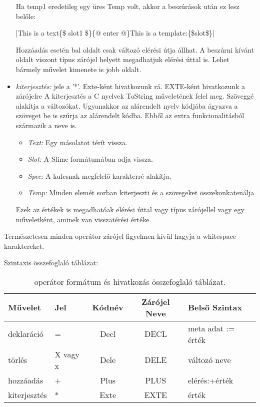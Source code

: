 \begin{itemize}
Ha temp1 eredetileg egy üres Temp volt, akkor a beszúrások után ez lesz belőle:

{|This is a text\{\$ slot1 \$\}\{@ enter @\}This is a template:\{\$slot\$\}|}

Hozzáadás esetén bal oldalt csak változó elérési útja állhat.
A beszúrni kívánt oldalt viszont típus zárójel helyett megadhatjuk elérési úttal is.
Lehet bármely művelet kimenete is jobb oldalt.
\item \emph{kiterjesztés:}
jele a '*'.
Exte-ként hivatkozunk rá.
EXTE-ként hivatkozunk a zárójelre
A kiterjesztés a C nyelvek ToString műveletének felel meg. 
Szöveggé alakítja a változókat.
Ugyanakkor az alárendelt nyelv kódjába ágyazva a szöveget be is szúrja az alárendelt kódba. 
Ebből az extra funkcionalitásból származik a neve is.
\begin{itemize}
\item\emph{Text:} Egy másolatot térít vissza.
\item\emph{Slot:} A Slime formátumában adja vissza.
\item\emph{Spec:} A kulcsnak megfelelő karakterré alakítja.
\item\emph{Temp:} Minden elemét sorban kiterjeszti és a szövegeket összekonkatenálja
\end{itemize}
Ezek az értékek is megadhatóak elérési úttal vagy típus zárójellel vagy egy műveletként, aminek van visszatérési értéke.
\end{itemize}

Természetesen minden operátor zárójel figyelmen kívül hagyja a whitespace karaktereket.

Szintaxis összefoglaló táblázat:
\begin{table}
\begin{center}
  \begin{tabular}{ | l | l | c | c | l |}
    \hline
    \textbf{Művelet}	& \textbf{Jel}	& \textbf{Kódnév}	& \textbf{Zárójel Neve}	& \textbf{Belső Szintax}	\\ \hline
    deklaráció			& = 			& Decl		 		& DECL					& meta adat := érték		\\ \hline
    törlés				& X vagy x		& Dele		 		& DELE					& változó neve				\\ \hline
    hozzáadás			& + 			& Plus		 		& PLUS					& elérés:+érték				\\ \hline
    kiterjesztés		& * 			& Exte		 		& EXTE					& érték						\\
    \hline
  \end{tabular}
\end{center}
\label{table:operBasic}
\caption{operátor formátum és hivatkozás összefoglaló táblázat.}
\end{table}

